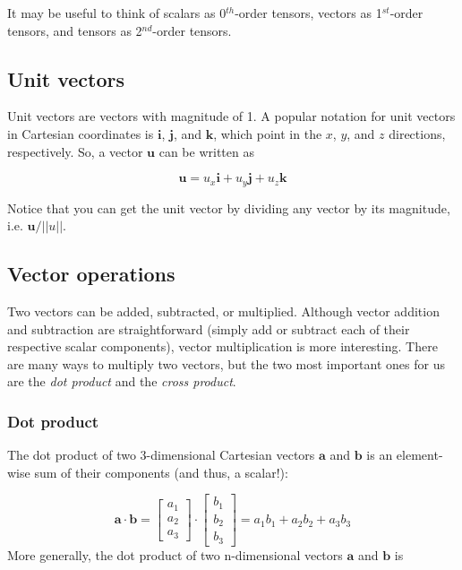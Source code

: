 \documentclass[12pt]{article}
\numberwithin{equation}{section}
\numberwithin{figure}{section}
\numberwithin{table}{section}
\begin{document}
It may be useful to think of scalars as 0$^{th}$-order tensors, vectors as
1$^{st}$-order tensors, and tensors as 2$^{nd}$-order tensors.\\

\subsection{Unit vectors}

Unit vectors are vectors with magnitude of 1.
A popular notation for unit vectors in Cartesian coordinates is $\mathbf{i}$,
$\mathbf{j}$, and $\mathbf{k}$, which point in the $x$, $y$, and $z$ directions,
respectively.
So, a vector $\mathbf{u}$ can be written as

\begin{equation}
  \mathbf{u} = u_x \mathbf{i} + u_y \mathbf{j} + u_z \mathbf{k}
  \label{eq:unit_vectors}
\end{equation}

Notice that you can get the unit vector by dividing any vector by its
magnitude, i.e. $\mathbf{u}/||u||$.

\subsection{Vector operations}

Two vectors can be added, subtracted, or multiplied.
Although vector addition and subtraction are straightforward (simply add or
subtract each of their respective scalar components), vector multiplication is
more interesting.
There are many ways to multiply two vectors, but the two most important ones for
us are the \textit{dot product} and the \textit{cross product}.

\subsubsection{Dot product}

The dot product of two 3-dimensional Cartesian vectors
$\mathbf{a}$ and $\mathbf{b}$ is an element-wise sum of their components
(and thus, a scalar!):

\begin{equation}
  \mathbf{a} \cdot \mathbf{b} =
  \begin{bmatrix}
    a_1 \\
    a_2 \\
    a_3
  \end{bmatrix}
  \cdot
  \begin{bmatrix}
    b_1 \\
    b_2 \\
    b_3
  \end{bmatrix}
  = a_1 b_1 + a_2 b_2 + a_3 b_3
\end{equation}
More generally, the dot product of two n-dimensional vectors $\mathbf{a}$ and
$\mathbf{b}$ is
\end{document}
